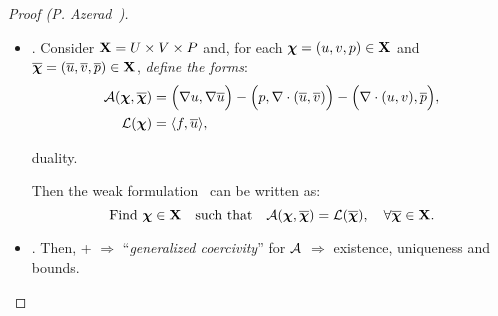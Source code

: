 \SetEmptyBackground
\begin{frame}
  \begin{proof}[Proof (P. Azerad~\cite{Azerad:PhD:96})]
    \begin{itemize}
    \item {}.
      Consider
      $\XX=\UU\times\VV\times\PP$ and, for each
      $\cc=(\uu,\vv,\pp)\in \XX$ and $\bc = (\bu, \bv, \bp)\in
      \XX$, \textit{define the forms}:
      \begin{align}
        \AA(\cc,\bc) & = \product{\grad \uu, \grad\bu} -
        \product{p,\div(\bu, \bv)} - \product{\div(\uu,v),\bp},
        \label{eq:HSoperator}
        \\
        \LL(\cc) & = \langle f,\bu \rangle,
        \label{eq:HSlinearform}
      \end{align}
      \begin{flushleft}
      duality.
      \end{flushleft}

      Then the weak formulation
      \hydStokes\ can be written as:
      \begin{equation}
        \label{eq:HS.weak.formulation}
        \text{Find}\ \cc\in \XX \quad\text{such that}\quad
        \AA(\cc,\bc) = \LL(\bc),
        \quad \forall \bc \in \XX.
      \end{equation}

    \item {}.
      Then, \ISp + \ISv $\Rightarrow$ ``\textit{generalized coercivity}'' for
      $\AA$ $\Rightarrow$ existence, uniqueness and bounds.
    \end{itemize}
  \end{proof}
\end{frame}
\SetDefaultBackground


